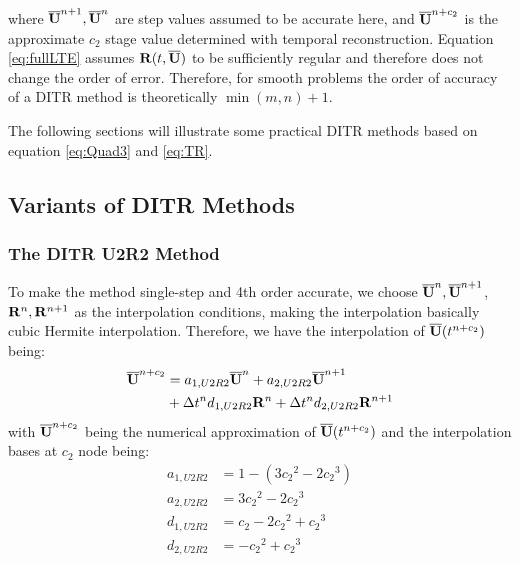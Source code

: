 \documentclass[preprint,12pt]{elsarticle}
\begin{document}
where $\overline{\mathbf{U}}^{n+1}, \overline{\mathbf{U}}^{n}$ are step values assumed to be accurate here, and
$\overline{\mathbf{U}}^{n+c_2}$ is the approximate
$c_2$ stage value determined with temporal reconstruction.
Equation \eqref{eq:fullLTE} assumes
$\mathbf{R}(t, \overline{\mathbf{U}})$ to be sufficiently regular and therefore does not
change the order of error.
Therefore, for smooth problems the
order of accuracy of a DITR
method is theoretically $\min(m,n) + 1$.






The following sections will illustrate some
practical DITR methods based on equation \eqref{eq:Quad3} and \eqref{eq:TR}.


\subsection{Variants of DITR Methods}



\subsubsection{The DITR U2R2 Method}

To make the method single-step and 4th order accurate,
we choose $\overline{\mathbf{U}}^{n},\overline{\mathbf{U}}^{n+1}$, $\mathbf{R}^{n},\mathbf{R}^{n+1}$ as
the interpolation conditions, making the interpolation
basically cubic Hermite interpolation.
Therefore, we have the interpolation of $\overline{\mathbf{U}}(t^{n+c_2})$
being:
\begin{equation}
    \begin{aligned}
        \label{eq:TRU2R2}
        \overline{\mathbf{U}}^{n+c_2} & =
        a_{1,U2R2}\overline{\mathbf{U}}^{n} +
        a_{2,U2R2}\overline{\mathbf{U}}^{n + 1}
        \\ & +
        \mathrm\Delta t^n d_{1,U2R2}\mathbf{R}^{n} +
        \mathrm\Delta t^n d_{2,U2R2}\mathbf{R}^{n + 1}
    \end{aligned}
\end{equation}
with $\overline{\mathbf{U}}^{n+c_2}$ being
the numerical approximation
of $\overline{\mathbf{U}}(t^{n+c_2})$
and the interpolation bases at $c_2$ node being:
\begin{equation}
    \begin{aligned}
        a_{1,U2R2} & = 1 - (3{c_2}^2 - 2 {c_2}^3)  \\
        a_{2,U2R2} & = 3{c_2}^2 - 2 {c_2}^3        \\
        d_{1,U2R2} & = {c_2} - 2 {c_2}^2 + {c_2}^3 \\
        d_{2,U2R2} & = - {c_2}^2 + {c_2}^3         \\
    \end{aligned}
    \label{eq:interpU2R2}
\end{equation}
\end{document}
